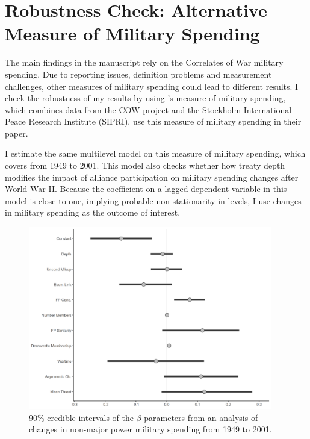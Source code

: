 \documentclass[12pt]{article}
\begin{document}
\section{Robustness Check: Alternative Measure of Military Spending}

The main findings in the manuscript rely on the Correlates of War military spending. 
Due to reporting issues, definition problems and measurement challenges, other measures of military spending could lead to different results. 
I check the robustness of my results by using \citet{Nordhausetal2012}'s measure of military spending, which combines data from the COW project and the Stockholm International Peace Research Institute (SIPRI). 
\citet{DigiuseppePoast2016} use this measure of military spending in their paper. 


I estimate the same multilevel model on this measure of military spending, which covers from 1949 to 2001. 
This model also checks whether how treaty depth modifies the impact of alliance participation on military spending changes after World War II.
Because the coefficient on a lagged dependent variable in this model is close to one, implying probable non-stationarity in levels, I use changes in military spending as the outcome of interest. 


\begin{figure}[htbp]
	\centering
		\includegraphics[width=0.95\textwidth]{post45-beta-res.png}
	\caption{90\% credible intervals of the $\beta$ parameters from an analysis of changes in non-major power military spending from 1949 to 2001.}
	\label{fig:post45-beta-res}
\end{figure}
\end{document}
